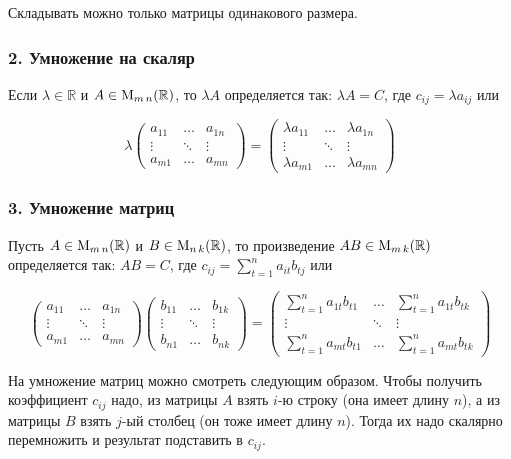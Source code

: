 \documentclass{article}
\begin{document}
Складывать можно только матрицы одинакового размера.

\subsubsection*{2. Умножение на скаляр} Если $\lambda\in \mathbb R$ и $A\in \operatorname{M}_{m\,n}(\mathbb R)$, то $\lambda A$ определяется так: $\lambda A = C$, где $c_{ij} = \lambda a_{ij}$ или

\[
\lambda
\begin{pmatrix}
	a_{11}&\ldots& a_{1n}\\
	\vdots&\ddots&\vdots\\
	a_{m1}& \ldots &a_{mn}
\end{pmatrix}
=
\begin{pmatrix}
	\lambda a_{11}&\ldots& \lambda a_{1n}\\
	\vdots&\ddots&\vdots\\
	\lambda a_{m1}& \ldots &\lambda a_{mn}
\end{pmatrix}
\]

\subsubsection*{3. Умножение матриц} Пусть $A\in\operatorname{M}_{m\,n}(\mathbb R)$ и $B\in\operatorname{M}_{n\,k}(\mathbb R)$, то произведение $AB\in\operatorname{M}_{m\,k}(\mathbb R)$ определяется так: $AB = C$, где $c_{ij} = \sum_{t=1}^n a_{it}b_{tj}$ или

\[
\begin{pmatrix}
	a_{11}&\ldots& a_{1n}\\
	\vdots&\ddots&\vdots\\
	a_{m1}& \ldots &a_{mn}
\end{pmatrix}
\begin{pmatrix}
	b_{11}&\ldots& b_{1k}\\
	\vdots&\ddots&\vdots\\
	b_{n1}& \ldots &b_{nk}
\end{pmatrix}
=
\begin{pmatrix}
	\sum_{t=1}^n a_{1t}b_{t1}&\ldots& \sum_{t=1}^n a_{1t}b_{tk}\\
	\vdots&\ddots&\vdots\\
	\sum_{t=1}^n a_{mt}b_{t1}& \ldots &\sum_{t=1}^n a_{mt}b_{tk}
\end{pmatrix}
\]

На умножение матриц можно смотреть следующим образом. Чтобы получить коэффициент $c_{ij}$ надо, из матрицы $A$ взять $i$-ю строку (она имеет длину $n$), а из матрицы $B$ взять $j$-ый столбец (он тоже имеет длину $n$). Тогда их надо скалярно перемножить и результат подставить в $c_{ij}$.
\end{document}
